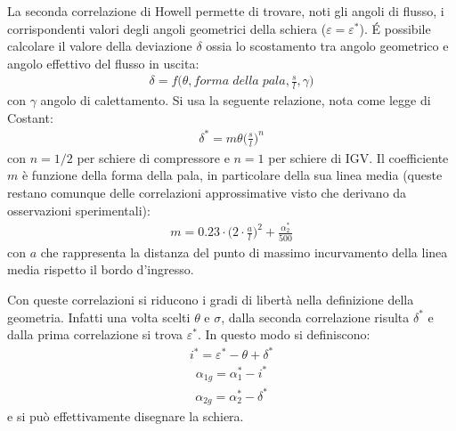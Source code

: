 La seconda correlazione di Howell permette di trovare, noti gli angoli di flusso, i corrispondenti valori degli angoli geometrici della schiera ($\varepsilon = \varepsilon^*$). \'E possibile calcolare il valore della deviazione $\delta$ ossia lo scostamento tra angolo geometrico e angolo effettivo del flusso in uscita:
\begin{align*}
\delta = f \bigg( \theta, forma \; della \; pala, \frac{s}{l}, \gamma \bigg)
\end{align*}
con $\gamma$ angolo di calettamento. Si usa la seguente relazione, nota come legge di Costant:
\begin{align*}
\boxed{\delta^* = m \theta \bigg( \frac{s}{l} \bigg)^n}
\end{align*}
con $n = 1/2$ per schiere di compressore e $n = 1$ per schiere di IGV. Il coefficiente $m$ è funzione della forma della pala, in particolare della sua linea media (queste restano comunque delle correlazioni approssimative visto che derivano da osservazioni sperimentali):
\begin{align*}
m = 0.23 \cdot \bigg( 2 \cdot \frac{a}{l} \bigg)^2 + \frac{\alpha_2^*}{500}
\end{align*}
con $a$ che rappresenta la distanza del punto di massimo incurvamento della linea media rispetto il bordo d'ingresso. 

Con queste correlazioni si riducono i gradi di libertà nella definizione della geometria. Infatti una volta scelti $ \theta$ e $\sigma $, dalla seconda correlazione risulta $ \delta^* $ e dalla prima correlazione si trova $ \varepsilon^* $. In questo modo si definiscono:
\begin{align*}
i^* = \varepsilon^* - \theta + \delta^*
\end{align*}
\begin{align*}
\alpha_{1g} = \alpha_1^* - i^*
\end{align*}
\begin{align*}
\alpha_{2g} = \alpha_2^* - \delta^*
\end{align*}
e si può effettivamente disegnare la schiera. 

